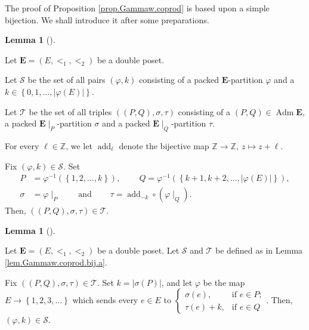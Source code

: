 \documentclass[numbers=enddot,12pt,final,onecolumn,notitlepage,abstracton]{scrartcl}
\theoremstyle{definition}
\newtheorem{lem}[theo]{Lemma}
\newenvironment{lemma}[1][]
{\begin{lem}[#1]\begin{leftbar}}
{\end{leftbar}\end{lem}}
\newenvironment{verlong}{}{}
\newcommand{\Adm}{\operatorname{Adm}}
\newcommand{\EE}{{\mathbf{E}}}
\begin{document}
\begin{verlong}
The proof of Proposition \ref{prop.Gammaw.coprod} is based upon a simple
bijection. We shall introduce it after some preparations.

\begin{lemma}
\label{lem.Gammaw.coprod.bij.a}Let $ \EE =\left(  E,<_{1},<_{2}\right)
$ be a double poset.

Let $\mathcal{S}$ be the set of all pairs $\left(  \varphi,k\right)  $
consisting of a packed $\EE$-partition $\varphi$ and a $k\in\left\{
0,1,\ldots,\left\vert \varphi\left(  E\right)  \right\vert \right\}  $.

Let $\mathcal{T}$ be the set of all triples $\left(  \left(  P,Q\right)
,\sigma,\tau\right)  $ consisting of a $\left(  P,Q\right)  \in
\Adm \EE $, a packed $ \EE \mid_{P}$-partition
$\sigma$ and a packed $ \EE \mid_{Q}$-partition $\tau$.

For every $\ell\in\mathbb{Z}$, we let $\operatorname{add}_{\ell}$
denote the bijective map $\mathbb{Z}\rightarrow\mathbb{Z},\ z\mapsto z+\ell$.

Fix $\left(  \varphi,k\right)  \in\mathcal{S}$. Set
\begin{align}
P  &  =\varphi^{-1}\left(  \left\{  1,2,\ldots,k\right\}  \right)
,\ \ \ \ \ \ \ \ \ \ Q=\varphi^{-1}\left(  \left\{  k+1,k+2,\ldots,\left\vert
\varphi\left(  E\right)  \right\vert \right\}  \right)
,\label{eq.lem.Gammaw.coprod.bij.def1}\\
\sigma &  =\varphi\mid_{P}\ \ \ \ \ \ \ \ \ \ \text{and}
\ \ \ \ \ \ \ \ \ \ \tau=\operatorname{add}_{-k}\circ\left(
\varphi\mid_{Q}\right)  .
\label{eq.lem.Gammaw.coprod.bij.def2}
\end{align}
Then, $\left(  \left(  P,Q\right)  ,\sigma,\tau\right)  \in\mathcal{T}$.
\end{lemma}

\begin{lemma}
\label{lem.Gammaw.coprod.bij.b}
Let $\EE = \left(  E,<_{1},<_{2}\right)  $
be a double poset. Let $\mathcal{S}$ and $\mathcal{T}$ be defined as in Lemma
\ref{lem.Gammaw.coprod.bij.a}.

Fix $\left(  \left(  P,Q\right)  ,\sigma,\tau\right)  \in\mathcal{T}$. Set
$k=\left\vert \sigma\left(  P\right)  \right\vert $, and let $\varphi$ be the
map $E\rightarrow\left\{  1,2,3,\ldots\right\}  $ which sends every $e\in E$
to $%
\begin{cases}
\sigma\left(  e\right)  , & \text{if }e\in P;\\
\tau\left(  e\right)  +k, & \text{if }e\in Q
\end{cases}
$. Then, $\left(  \varphi,k\right)  \in\mathcal{S}$.
\end{lemma}


\end{verlong}
\end{document}

